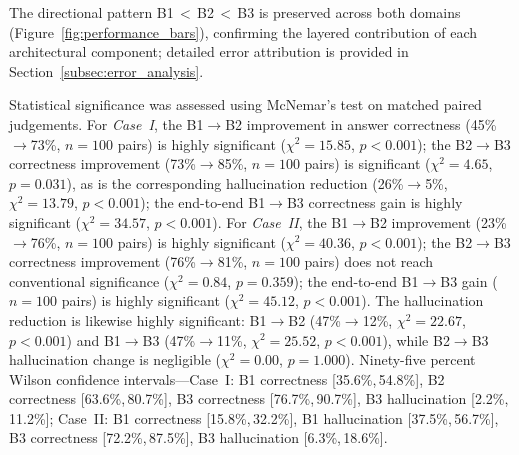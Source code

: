 \documentclass[largeformat]{interact}
\begin{document}
The directional pattern B1\,$<$\,B2\,$<$\,B3 is preserved across both domains (Figure~\ref{fig:performance_bars}), confirming the layered contribution of each architectural component; detailed error attribution is provided in Section~\ref{subsec:error_analysis}.


Statistical significance was assessed using McNemar's test on matched paired judgements. For \textit{Case~I}, the B1$\rightarrow$B2 improvement in answer correctness (45\%$\rightarrow$73\%, $n = 100$ pairs) is highly significant ($\chi^2 = 15.85$, $p < 0.001$); the B2$\rightarrow$B3 correctness improvement (73\%$\rightarrow$85\%, $n = 100$ pairs) is significant ($\chi^2 = 4.65$, $p = 0.031$), as is the corresponding hallucination reduction (26\%$\rightarrow$5\%, $\chi^2 = 13.79$, $p < 0.001$); the end-to-end B1$\rightarrow$B3 correctness gain is highly significant ($\chi^2 = 34.57$, $p < 0.001$).
For \textit{Case~II}, the B1$\rightarrow$B2 improvement (23\%$\rightarrow$76\%, $n = 100$ pairs) is highly significant ($\chi^2 = 40.36$, $p < 0.001$); the B2$\rightarrow$B3 correctness improvement (76\%$\rightarrow$81\%, $n = 100$ pairs) does not reach conventional significance ($\chi^2 = 0.84$, $p = 0.359$); the end-to-end B1$\rightarrow$B3 gain ($n = 100$ pairs) is highly significant ($\chi^2 = 45.12$, $p < 0.001$). The hallucination reduction is likewise highly significant: B1$\rightarrow$B2 (47\%$\rightarrow$12\%, $\chi^2 = 22.67$, $p < 0.001$) and B1$\rightarrow$B3 (47\%$\rightarrow$11\%, $\chi^2 = 25.52$, $p < 0.001$), while B2$\rightarrow$B3 hallucination change is negligible ($\chi^2 = 0.00$, $p = 1.000$). Ninety-five percent Wilson confidence intervals---Case~I: B1 correctness [35.6\%,\,54.8\%], B2 correctness [63.6\%,\,80.7\%], B3 correctness [76.7\%,\,90.7\%], B3 hallucination [2.2\%,\,11.2\%]; Case~II: B1 correctness [15.8\%,\,32.2\%], B1 hallucination [37.5\%,\,56.7\%], B3 correctness [72.2\%,\,87.5\%], B3 hallucination [6.3\%,\,18.6\%].
\end{document}
